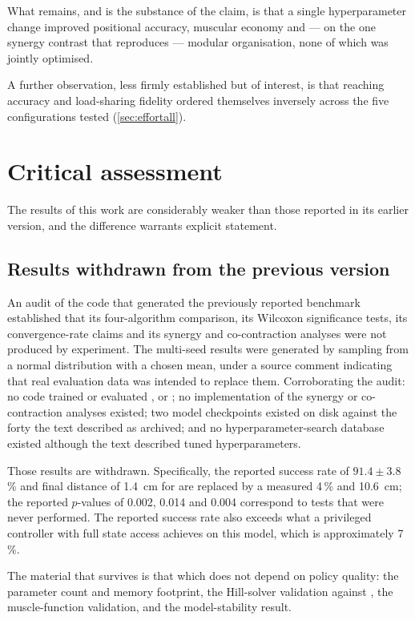 What remains, and is the substance of the claim, is that a single hyperparameter
change improved positional accuracy, muscular economy and --- on the one synergy
contrast that reproduces --- modular organisation, none of which was jointly
optimised.

A further observation, less firmly established but of interest, is that reaching
accuracy and load-sharing fidelity ordered themselves inversely across the five
configurations tested (\cref{sec:effortall}).

\section{Critical assessment}

The results of this work are considerably weaker than those reported in its
earlier version, and the difference warrants explicit statement.

\subsection{Results withdrawn from the previous version}

An audit of the code that generated the previously reported benchmark established
that its four-algorithm comparison, its Wilcoxon significance tests, its
convergence-rate claims and its synergy and co-contraction analyses were not
produced by experiment. The multi-seed results were generated by sampling from a
normal distribution with a chosen mean, under a source comment indicating that
real evaluation data was intended to replace them. Corroborating the audit: no
code trained or evaluated \DDPG, \TDIII or \PPO; no implementation of the synergy
or co-contraction analyses existed; two model checkpoints existed on disk against
the forty the text described as archived; and no hyperparameter-search database
existed although the text described tuned hyperparameters.

Those results are withdrawn. Specifically, the reported success rate of
$91.4 \pm 3.8$\,\% and final distance of \SI{1.4}{\centi\meter} for \SAC are
replaced by a measured 4\,\% and \SI{10.6}{\centi\meter}; the reported $p$-values
of 0.002, 0.014 and 0.004 correspond to tests that were never performed. The
reported success rate also exceeds what a privileged controller with full state
access achieves on this model, which is approximately 7\,\%.

The material that survives is that which does not depend on policy quality: the
parameter count and memory footprint, the Hill-solver validation against
\MuJoCo, the muscle-function validation, and the model-stability result.

